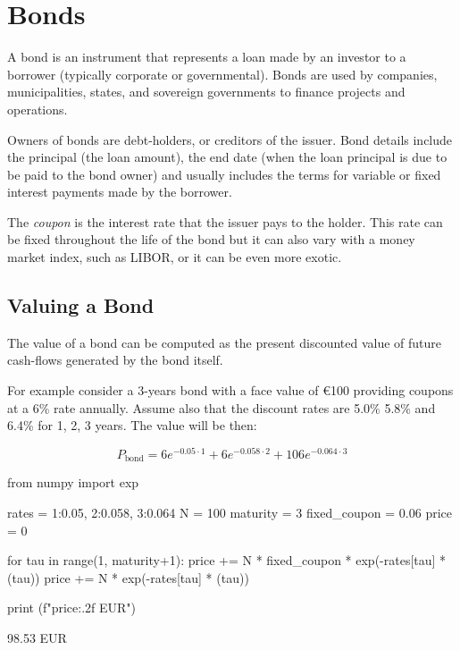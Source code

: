 \chapter{Bonds}
\label{bonds}

A bond is an instrument that represents a loan made by an investor to a borrower (typically corporate or governmental). Bonds are used by companies, municipalities, states, and sovereign governments to finance projects and operations. 

Owners of bonds are debt-holders, or creditors of the issuer. Bond details include the principal (the loan amount), the end date (when the loan principal is due to be paid to the bond owner) and usually includes the terms for variable or fixed interest payments made by the borrower.

The \emph{coupon} is the interest rate that the issuer pays to the holder. This rate can be fixed throughout the life of the bond but it can also vary with a money market index, such as LIBOR, or it can be even more exotic.

\section{Valuing a Bond}
\label{sec:bond_pricing}

The value of a bond can be computed as the present discounted value of future cash-flows generated by the bond itself.

For example consider a 3-years bond with a face value of \euro{100} providing coupons at a 6\% rate annually. Assume also that the discount rates are 5.0\% 5.8\% and 6.4\% for 1, 2, 3 years. The value will be then:

\begin{equation*}
P_{\mathrm{bond}}=6e^{-0.05\cdot 1}+6e^{-0.058\cdot 2}+106e^{-0.064\cdot 3}
\end{equation*}

\begin{ipython}
from numpy import exp

rates = {1:0.05, 2:0.058, 3:0.064}
N = 100
maturity = 3
fixed_coupon = 0.06
price = 0

for tau in range(1, maturity+1):
    price += N * fixed_coupon * exp(-rates[tau] * (tau))
price += N * exp(-rates[tau] * (tau))

print (f"{price:.2f} EUR")
\end{ipython}
\begin{ioutput}
98.53 EUR
\end{ioutput}

